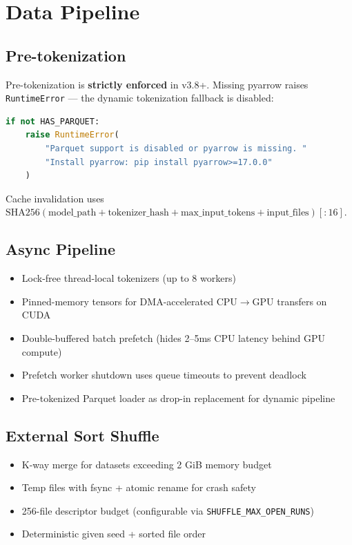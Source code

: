\documentclass[11pt,a4paper,twoside]{article}
\begin{document}
\section{Data Pipeline}

\subsection{Pre-tokenization}

Pre-tokenization is \textbf{strictly enforced} in v3.8+. Missing pyarrow raises
\texttt{RuntimeError} --- the dynamic tokenization fallback is disabled:

\begin{lstlisting}[language=Python, caption=Pre-tokenization Enforcement]
if not HAS_PARQUET:
    raise RuntimeError(
        "Parquet support is disabled or pyarrow is missing. "
        "Install pyarrow: pip install pyarrow>=17.0.0"
    )
\end{lstlisting}

Cache invalidation uses $\text{SHA256}(\text{model\_path} + \text{tokenizer\_hash}
+ \text{max\_input\_tokens} + \text{input\_files})[:16]$.

\subsection{Async Pipeline}

\begin{itemize}[nosep]
  \item Lock-free thread-local tokenizers (up to 8 workers)
  \item Pinned-memory tensors for DMA-accelerated CPU$\rightarrow$GPU transfers on CUDA
  \item Double-buffered batch prefetch (hides 2--5ms CPU latency behind GPU compute)
  \item Prefetch worker shutdown uses queue timeouts to prevent deadlock
  \item Pre-tokenized Parquet loader as drop-in replacement for dynamic pipeline
\end{itemize}

\subsection{External Sort Shuffle}

\begin{itemize}[nosep]
  \item K-way merge for datasets exceeding 2 GiB memory budget
  \item Temp files with fsync + atomic rename for crash safety
  \item 256-file descriptor budget (configurable via \texttt{SHUFFLE\_MAX\_OPEN\_RUNS})
  \item Deterministic given seed + sorted file order
\end{itemize}
\end{document}
